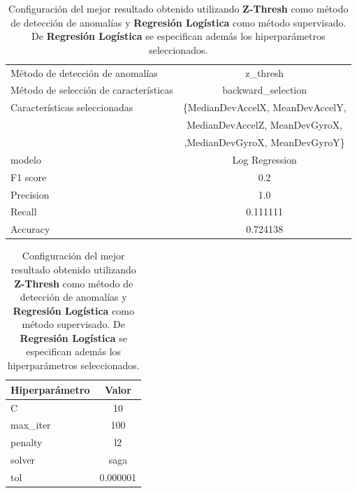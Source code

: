 \begin{appendices}
		\begin{table}[htb]
			\centering
			\caption{Configuración del mejor resultado obtenido utilizando \textbf{Z-Thresh} como método de detección de anomalías y \textbf{Regresión Logística}
			como método supervisado. De \textbf{Regresión Logística} se especifican además los hiperparámetros seleccionados.}
			\label{table:29}
			\begin{tabular}{lc}
				\toprule
					  Método de detección de anomalías &                                           z\_thresh \\
				Método de selección de características &                                 backward\_selection \\
						 Características seleccionadas & \{MedianDevAccelX, MeanDevAccelY, \\ 
						                               &  MedianDevAccelZ, MeanDevGyroX, \\
						 							   &    ,MedianDevGyroX, MeanDevGyroY\}\\		
												modelo &                                     Log Regression \\
											  F1 score &                                                0.2 \\
											 Precision &                                                1.0 \\
												Recall &                                           0.111111 \\
											  Accuracy &                                           0.724138 \\
				\bottomrule
			\end{tabular}
			\newline
			\newline

			\begin{tabular}{lc}
				\toprule
				Hiperparámetro &     Valor \\
				\midrule
							 C &        10 \\
					  max\_iter &       100 \\
					   penalty &        l2 \\
						solver &      saga \\
						   tol &  0.000001 \\
				\bottomrule
			\end{tabular}
			
		\end{table}


\end{appendices}
